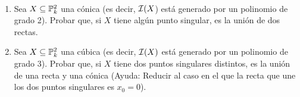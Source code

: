 \documentclass[twoside]{article}
\begin{document}
\newpage
\begin{ejercicio}{6}\
 
\begin{enumerate}
\item\label{1} Sea $X \subseteq \mathbb{P}^2_k$ una cónica (es decir, $\mathcal{I}(X$) está generado por
un polinomio de grado 2). Probar que, si $X$ tiene algún punto singular,
es la unión de dos rectas.

\item\label{2} Sea $X \subseteq \mathbb{P}^2_k$ una cúbica (es decir, $\mathcal{I}(X)$ está generado por un polinomio
de grado 3). Probar que, si $X$ tiene dos puntos singulares distintos, es la
unión de una recta y una cónica (Ayuda: Reducir al caso en el que la recta
que une los dos puntos singulares es $x_0 = 0$).

\end{enumerate}
\end{ejercicio}
\end{document}
